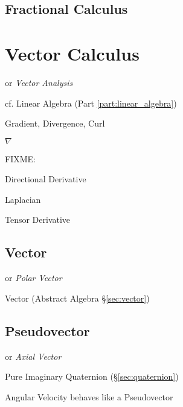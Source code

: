 \subsection{Fractional Calculus}\label{sec:fractional_calculus}



\section{Vector Calculus}\label{sec:vector_calculus}

or \emph{Vector Analysis}

\fist cf. Linear Algebra (Part \ref{part:linear_algebra})

Gradient, Divergence, Curl

$\nabla$

FIXME:

Directional Derivative

Laplacian

Tensor Derivative



\subsection{Vector}\label{sec:linear_vector}

or \emph{Polar Vector}

\fist Vector (Abstract Algebra \S\ref{sec:vector})



\subsection{Pseudovector}\label{sec:pseudovector}

or \emph{Axial Vector}

\fist Pure Imaginary Quaternion (\S\ref{sec:quaternion})

Angular Velocity behaves like a Pseudovector


